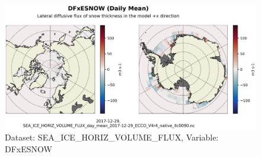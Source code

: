 \begin{figure}[H]
\centering
\includegraphics[scale=0.55]{../images/plots/native_plots/Sea-Ice_and_Snow_Horizontal_Volume_Fluxes/DFxESNOW.png}
\caption{Dataset: SEA\_ICE\_HORIZ\_VOLUME\_FLUX, Variable: DFxESNOW}
\label{tab:table-SEA_ICE_HORIZ_VOLUME_FLUX_DFxESNOW-Plot}
\end{figure}
\pagebreak
